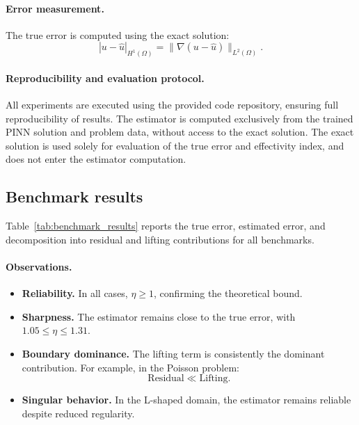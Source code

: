\paragraph{Error measurement.}
The true error is computed using the exact solution:
\[
|u - \hat{u}|_{H^1(\Omega)} = \|\nabla(u - \hat{u})\|_{L^2(\Omega)}.
\]

\paragraph{Reproducibility and evaluation protocol.}
All experiments are executed using the provided code repository,
ensuring full reproducibility of results. The estimator is computed
exclusively from the trained PINN solution and problem data, without
access to the exact solution.
The exact solution is used solely for evaluation of the true error and
effectivity index, and does not enter the estimator computation.

\subsection{Benchmark results}

Table~\ref{tab:benchmark_results} reports the true error, estimated error,
and decomposition into residual and lifting contributions for all benchmarks.

\begin{table}[h]
\centering
\caption{Estimator performance across benchmarks.}
\label{tab:benchmark_results}
\resizebox{\textwidth}{!}{%

}
\end{table}

\paragraph{Observations.}

\begin{itemize}
\item \textbf{Reliability.}
In all cases, $\eta \ge 1$, confirming the theoretical bound.

\item \textbf{Sharpness.}
The estimator remains close to the true error, with
$1.05 \le \eta \le 1.31$.

\item \textbf{Boundary dominance.}
The lifting term is consistently the dominant contribution.
For example, in the Poisson problem:
\[
\text{Residual} \ll \text{Lifting}.
\]

\item \textbf{Singular behavior.}
In the L-shaped domain, the estimator remains reliable despite
reduced regularity.
\end{itemize}

